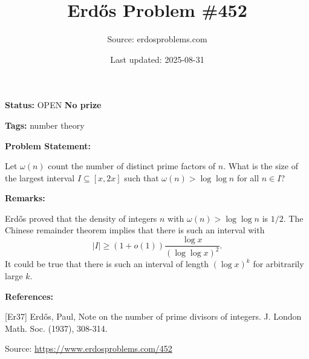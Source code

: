\documentclass{article}
\title{Erd\H{o}s Problem \#452}
\date{Last updated: 2025-08-31}
\author{Source: erdosproblems.com}
\begin{document}
\maketitle

\noindent\textbf{Status:} OPEN \quad \textbf{No prize}

\noindent\textbf{Tags:} number theory

\medskip
\noindent\textbf{Problem Statement:}

Let $\omega(n)$ count the number of distinct prime factors of $n$. What is the size of the largest interval $I\subseteq [x,2x]$ such that $\omega(n)>\log\log n$ for all $n\in I$?

\bigskip
\noindent\textbf{Remarks:}

Erd\H{o}s \cite{Er37} proved that the density of integers $n$ with $\omega(n)>\log\log n$ is $1/2$. The Chinese remainder theorem implies that there is such an interval with\[\lvert I\rvert \geq (1+o(1))\frac{\log x}{(\log\log x)^2}.\]It could be true that there is such an interval of length $(\log x)^{k}$ for arbitrarily large $k$.

\bigskip
\noindent\textbf{References:}

[Er37] Erd\H{o}s, Paul, Note on the number of prime divisors of integers. J. London Math. Soc. (1937), 308-314.

\bigskip
\noindent\small{Source: \url{https://www.erdosproblems.com/452}}
\end{document}

